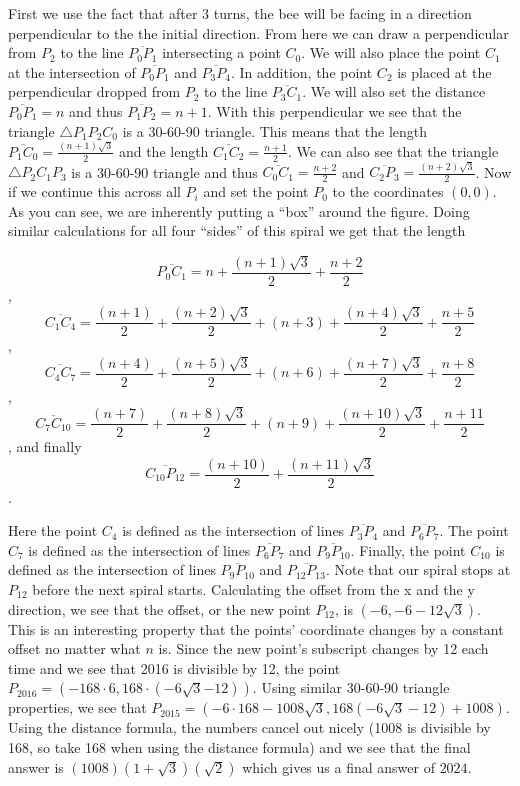 \begin{enumerate}
 
First we use the fact that after 3 turns, the bee will be facing in a direction perpendicular to the the initial direction. From here we can draw a perpendicular from $P_2$ to the line $\overline{P_0P_1}$ intersecting a point $C_0$. We will also place the point $C_1$ at the intersection of $\overline{P_0P_1}$ and $\overline{P_3P_4}$. In addition, the point $C_2$ is placed at the perpendicular dropped from $P_2$ to the line $\overline{P_3C_1}$. We will also set the distance $\overline{P_0P_1} = n$ and thus $\overline{P_1P_2} = n+1$. With this perpendicular we see that the triangle $\triangle{P_1P_2C_0}$ is a 30-60-90 triangle. This means that the length $\overline{P_1C_0} = \frac{(n+1)\sqrt{3}}{2}$ and the length $\overline{C_1C_2} = \frac{n+1}{2}$. We can also see that the triangle $\triangle{P_2C_1P_3}$ is a 30-60-90 triangle and thus $\overline{C_0C_1} = \frac{n+2}{2}$ and $\overline{C_2P_3} = \frac{(n+2)\sqrt{3}}{2}$. Now if we continue this across all $P_i$ and set the point $P_0$ to the coordinates $(0, 0)$. As you can see, we are inherently putting a “box” around the figure. Doing similar calculations for all four “sides” of this spiral we get that the length

 
 \[\overline{P_0C_1} = n + \frac{(n+1)\sqrt{3}}{2} + \frac{n+2}{2}\],   
 \[\overline{C_1C_4} = \frac{(n+1)}{2} + \frac{(n+2)\sqrt{3}}{2} + (n+3) + \frac{(n+4)\sqrt{3}}{2} + \frac{n+5}{2}\], 
 \[\overline{C_4C_7} = \frac{(n+4)}{2} + \frac{(n+5)\sqrt{3}}{2} + (n+6) + \frac{(n+7)\sqrt{3}}{2} + \frac{n+8}{2}\], 
 \[\overline{C_7C_{10}} = \frac{(n+7)}{2} + \frac{(n+8)\sqrt{3}}{2} + (n+9) + \frac{(n+10)\sqrt{3}}{2} + \frac{n+11}{2}\], and finally 
 \[\overline{C_{10}P_{12}} = \frac{(n+10)}{2} + \frac{(n+11)\sqrt{3}}{2}\]. 

 Here the point $C_4$ is defined as the intersection of lines $\overline{P_3P_4}$ and $\overline{P_6P_7}$. The point $C_7$ is defined as the intersection of lines $\overline{P_6P_7}$ and $\overline{P_9P_{10}}$. Finally, the point $C_10$ is defined as the intersection of lines $\overline{P_{9}P_{10}}$ and $\overline{P_{12}P_{13}}$. Note that our spiral stops at $P_{12}$ before the next spiral starts. Calculating the offset from the x and the y direction, we see that the offset, or the new point $P_{12}$, is $({-6}, {-6}-12 \sqrt{3})$. This is an interesting property that the points’ coordinate changes by a constant offset no matter what $n$ is. Since the new point’s subscript changes by 12 each time and we see that 2016 is divisible by 12, the point $P_{2016} = ({-168} \cdot {6}, {168} \cdot ({-6} \sqrt{3} {-12}))$. Using similar 30-60-90 triangle properties, we see that $P_{2015} = ({-6} \cdot 168-1008 \sqrt{3}, 168({-6} \sqrt{3} - 12) + 1008)$. Using the distance formula, the numbers cancel out nicely (1008 is divisible by 168, so take 168 when using the distance formula) and we see that the final answer is $(1008)(1+\sqrt{3})(\sqrt{2})$ which gives us a final answer of $\boxed{2024}$.


\end{enumerate}
